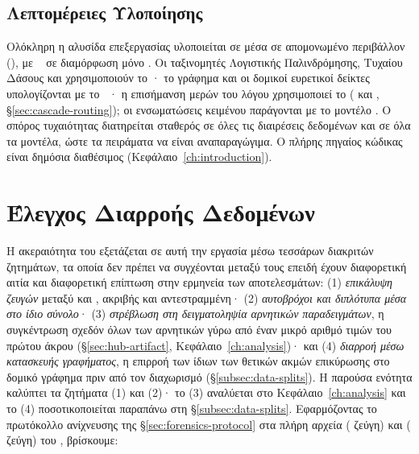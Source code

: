 \subsection{Λεπτομέρειες Υλοποίησης}
\label{subsec:implementation-details}

Ολόκληρη η αλυσίδα επεξεργασίας υλοποιείται σε  μέσα σε
απομονωμένο περιβάλλον  (\texttt{}), με ~\cite{paszke2019pytorch} σε
διαμόρφωση μόνο .
Οι ταξινομητές Λογιστικής Παλινδρόμησης, Τυχαίου Δάσους
και  χρησιμοποιούν το · το γράφημα και οι δομικοί
ευρετικοί δείκτες υπολογίζονται με το ~\cite{hagberg2008exploring}· η επισήμανση μερών του λόγου
χρησιμοποιεί το  (\texttt{} και
\texttt{}, \S\ref{sec:cascade-routing}); οι
ενσωματώσεις κειμένου παράγονται με το μοντέλο 
\texttt{\en{\EmbeddingModelName{}}}.
Ο σπόρος τυχαιότητας
\Seed{} διατηρείται σταθερός σε όλες τις διαιρέσεις δεδομένων και σε όλα τα μοντέλα,
ώστε τα πειράματα να είναι αναπαραγώγιμα.
Ο πλήρης πηγαίος κώδικας είναι δημόσια
διαθέσιμος (Κεφάλαιο~\ref{ch:introduction}).


\section{Έλεγχος Διαρροής Δεδομένων}
\label{sec:leakage-results}

Η ακεραιότητα του  εξετάζεται σε αυτή την εργασία μέσω τεσσάρων
διακριτών ζητημάτων, τα οποία δεν πρέπει να συγχέονται μεταξύ τους επειδή έχουν
διαφορετική αιτία και διαφορετική επίπτωση στην ερμηνεία των αποτελεσμάτων: (1)
\textit{επικάλυψη ζευγών} μεταξύ \texttt{} και
\texttt{}, ακριβής και αντεστραμμένη· (2) \textit{αυτοβρόχοι και
διπλότυπα μέσα στο ίδιο σύνολο}· (3) \textit{στρέβλωση στη δειγματοληψία αρνητικών παραδειγμάτων}, η
συγκέντρωση σχεδόν όλων των αρνητικών γύρω από έναν μικρό αριθμό τιμών του
πρώτου άκρου (\S\ref{sec:hub-artifact}, Κεφάλαιο~\ref{ch:analysis})· και (4)
\textit{διαρροή μέσω κατασκευής γραφήματος}, η επιρροή των ίδιων των
θετικών ακμών επικύρωσης στο δομικό γράφημα πριν από τον διαχωρισμό
(\S\ref{subsec:data-splits}). Η παρούσα ενότητα καλύπτει τα ζητήματα (1) και
(2)· το (3) αναλύεται στο Κεφάλαιο~\ref{ch:analysis} και το (4) ποσοτικοποιείται
παραπάνω στη \S\ref{subsec:data-splits}.
Εφαρμόζοντας το πρωτόκολλο ανίχνευσης της \S\ref{sec:forensics-protocol} στα
πλήρη αρχεία \texttt{} (\TrainPairs{} ζεύγη) και \texttt{}
(\TestPairs{} ζεύγη) του , βρίσκουμε:

